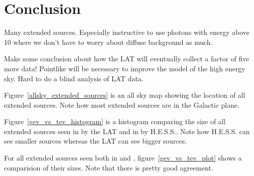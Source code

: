 \documentclass[12pt,preprint]{aastex}
\newcommand{\gev}{\text{GeV}\xspace}
\newcommand{\tev}{\text{TeV}\xspace}
\begin{document}
\section{Conclusion}


Many extended sources. Especially instructive to
use photons with energy above 10 \gev where we don't have
to worry about diffuse background as much.

Make some conclusion about how the LAT will eventually collect a factor
of five more data! Pointlike will be necessary to improve the model of the
high energy sky. Hard to do a blind analysis of LAT data.

Figure~\ref{allsky_extended_sources} is an all sky map showing the
location of all \gev extended sources. Note how most
extended sources are in the Galactic plane.

Figure~\ref{gev_vs_tev_histogram} is a histogram comparing the size of
all extended sources seen in \gev by the LAT and in \tev by H.E.S.S..
Note how H.E.S.S. can see smaller sources whereas the LAT
can see bigger sources.

For all extended sources seen both in \gev and \tev,
figure~\ref{gev_vs_tev_plot} shows a comparision of their sizes.
Note that there is pretty good agreement.





\appendix
\end{document}
